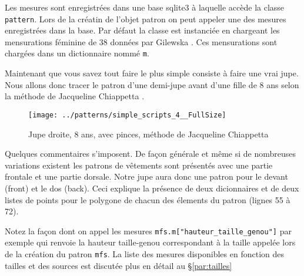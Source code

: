 \documentclass[10pt,a4paper,twoside]{report}
\begin{document}
Les mesures sont enregistrées dans une base sqlite3 à laquelle accède la classe \texttt{pattern}. Lors de la créatin de l'objet patron on peut appeler une des mesures enregistrées dans la base. Par défaut la classe est instanciée en chargeant les mensurations féminine de 38 données par Gilewska \cite{Gilewska1}. Ces mensurations sont chargées dans un dictionnaire nommé \texttt{m}.

Maintenant que vous savez tout faire le plus simple consiste à faire une vrai jupe. Nous allons donc tracer le patron d'une demi-jupe avant d'une fille de 8 ans selon la méthode de Jacqueline Chiappetta \cite{Chiappetta1999}.




\begin{figure}[tb]
\begin{center}
\texttt{[image: ../patterns/simple\_scripts\_4\_\_FullSize]}
\end{center}
\caption{Jupe droite, 8 ans, avec pinces, méthode de Jacqueline Chiappetta}
\label{fig:trapeze}
\end{figure}

Quelques commentaires s'imposent. De façon générale et même si de nombreuses variations existent les patrons de vêtements sont présentés avec une partie frontale et une partie dorsale. Notre jupe aura donc une patron pour le devant (front) et le dos (back). Ceci explique la présence de deux dicionnaires et de deux listes de points pour le polygone de chacun des élements du patron (lignes 55 à 72).

Notez la façon dont on appel les mesures \texttt{mfs.m["hauteur\_taille\_genou"]} par exemple qui renvoie la hauteur taille-genou correspondant à la taille appelée lors de la création du patron \texttt{mfs}. La liste des mesures disponibles en fonction des tailles et des sources est discutée plus en détail au \S\ref{par:tailles}
\end{document}

